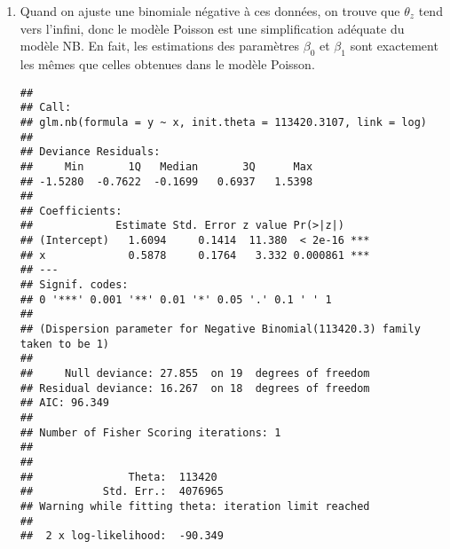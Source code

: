 \begin{solution}{6.4}
\begin{enumerate}
\item Quand on ajuste une binomiale négative à ces données, on trouve que $\theta_z$ tend vers l'infini, donc le modèle Poisson est une simplification adéquate du modèle NB. En fait, les estimations des paramètres $\beta_0$ et $\beta_1$ sont exactement les mêmes que celles obtenues dans le modèle Poisson.
\begin{knitrout}
\color{fgcolor}\begin{kframe}
\begin{alltt}
 \hlkwb{<-} \hlopt{~}
\end{alltt}


{\ttfamily\noindent\color{warningcolor}{\#\# Warning in theta.ml(Y, mu, sum(w), w, limit = control\$maxit, trace = control\$trace > : iteration limit reached}}

{\ttfamily\noindent\color{warningcolor}{\#\# Warning in theta.ml(Y, mu, sum(w), w, limit = control\$maxit, trace = control\$trace > : iteration limit reached}}\begin{alltt}
\end{alltt}
\begin{verbatim}
##
## Call:
## glm.nb(formula = y ~ x, init.theta = 113420.3107, link = log)
##
## Deviance Residuals:
##     Min       1Q   Median       3Q      Max
## -1.5280  -0.7622  -0.1699   0.6937   1.5398
##
## Coefficients:
##             Estimate Std. Error z value Pr(>|z|)
## (Intercept)   1.6094     0.1414  11.380  < 2e-16 ***
## x             0.5878     0.1764   3.332 0.000861 ***
## ---
## Signif. codes:
## 0 '***' 0.001 '**' 0.01 '*' 0.05 '.' 0.1 ' ' 1
##
## (Dispersion parameter for Negative Binomial(113420.3) family taken to be 1)
##
##     Null deviance: 27.855  on 19  degrees of freedom
## Residual deviance: 16.267  on 18  degrees of freedom
## AIC: 96.349
##
## Number of Fisher Scoring iterations: 1
##
##
##               Theta:  113420
##           Std. Err.:  4076965
## Warning while fitting theta: iteration limit reached
##
##  2 x log-likelihood:  -90.349
\end{verbatim}
\end{kframe}
\end{knitrout}


\end{enumerate}
\end{solution}
